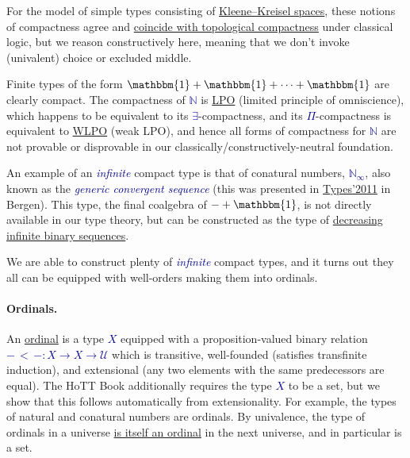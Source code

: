 \documentclass[a4paper]{easychair}
\newcommand{\db}{\textcolor{darkblue}}
\newcommand{\df}[1]{\emph{\db{#1}}}
\newcommand{\m}[1]{\db{$#1$}}
\newcommand{\N}{\mathbb{N}}
\newcommand{\NI}{\N_\infty}
\newcommand{\U}{\mathcal{U}}
\newcommand{\One}{\mathbbm{1}}
\begin{document}
For the model of simple types consisting of
\href{https://www.springer.com/gb/book/9783662479919}{Kleene--Kreisel
  spaces}, these notions of compactness agree and
\href{https://lmcs.episciences.org/693}{coincide with topological
  compactness} under classical logic, but we reason constructively
here, meaning that we don't invoke (univalent) choice or excluded
middle.

Finite types of the form \m{\One + \One + \cdots + \One} are clearly
compact. The compactness of \m{\N} is
\href{https://plato.stanford.edu/entries/mathematics-constructive/}{LPO}
(limited principle of omniscience), which happens to be equivalent to
its \m{\exists}-compactness, and its \m{\Pi}-compactness is equivalent
to
\href{https://journals.openedition.org/philosophiascientiae/406}{WLPO}
(weak LPO), and hence all forms of compactness for \m{\N} are not
provable or disprovable in our classically/constructively-neutral
foundation.

An example of an \df{infinite} compact type is that of conatural
numbers, \m{\NI}, also known as the \df{generic convergent sequence}
(this was presented in
\href{https://sites.google.com/site/types2011/program}{Types'2011} in
Bergen).  This type, the final coalgebra of \m{- + \One}, is not
directly available in our type theory, but can be constructed as the
type of
\href{https://www.cambridge.org/core/journals/journal-of-symbolic-logic/article/infinite-sets-that-satisfy-the-principle-of-omniscience-in-any-variety-of-constructive-mathematics/0D204ADE629B703578B848B8573FC83D}{decreasing
  infinite binary sequences}.

We are able to construct plenty of \df{infinite} compact types, and it
turns out they all can be equipped with well-orders making them into
ordinals.

\paragraph{Ordinals.}
An \href{https://homotopytypetheory.org/book/}{ordinal} is a type
\m{X} equipped with a proposition-valued binary relation
\m{{-}\,{<}\,{-} : X \to X \to \U} which is transitive, well-founded
(satisfies transfinite induction), and extensional (any two elements
with the same predecessors are equal). The HoTT Book additionally
requires the type \m{X} to be a set, but we show that this follows
automatically from extensionality. For example, the types of natural
and conatural numbers are ordinals. By univalence, the type of
ordinals in a universe \href{https://homotopytypetheory.org/book/}{is
  itself an ordinal} in the next universe, and in particular is a set.
\end{document}
